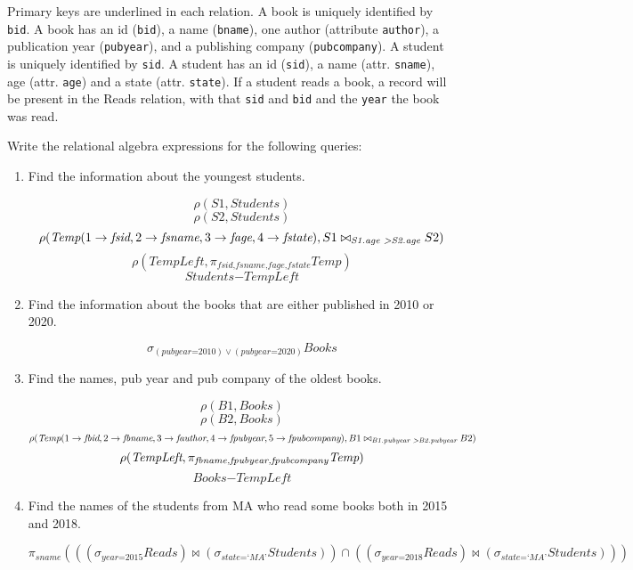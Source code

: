 \documentclass[letterpaper, 11pt]{article}
\begin{document}
Primary keys are underlined  in each relation. A book is uniquely identified by \texttt{bid}. A book has an id (\texttt{bid}), a name (\texttt{bname}), one author (attribute \texttt{author}), a publication year (\texttt{pubyear}), and a publishing company (\texttt{pubcompany}). A student is uniquely identified by \texttt{sid}. A student has an id (\texttt{sid}), a name (attr. \texttt{sname}), age (attr. \texttt{age}) and a state (attr. \texttt{state}). If a student reads a book, a record will be present in the Reads relation, with that \texttt{sid} and \texttt{bid} and the \texttt{year} the book was read.

Write the relational algebra expressions for the following queries:
\begin{enumerate}[label={\alph*}),leftmargin=*]
    \item Find the information about the youngest students.
    \begin{tcolorbox}
    \[\rho(S1, \textit{Students})\]
    \[\rho(S2, \textit{Students})\]
    \[\rho(\textit{Temp}(1 \to \textit{fsid}, 2 \to \textit{fsname}, 3 \to \textit{fage}, 4 \to \textit{fstate}), S1 \bowtie_{\textit{S1.age \textgreater S2.age}}S2)\]
    \[\rho(\textit{TempLeft}, \pi_{\textit{fsid,fsname,fage,fstate}}\textit{Temp})\]
    \[\textit{Students} - \textit{TempLeft}\]
    \end{tcolorbox}
    \item Find the information about the books that are either published in 2010 or 2020.
    \begin{tcolorbox}
    \[\sigma_{(\textit{pubyear=2010}) \vee (\textit{pubyear=2020})}\textit{Books}\]
    \end{tcolorbox}
    \item Find the names, pub year and pub company of the oldest books.
    \begin{tcolorbox}
    \[\rho(B1, \textit{Books})\]
    \[\rho(B2, \textit{Books})\]
    \[\rho(\textit{Temp}(1 \to \textit{fbid}, 2 \to \textit{fbname}, 3 \to \textit{fauthor}, 4 \to \textit{fpubyear}, 5 \to \textit{fpubcompany}), B1 \bowtie_{\textit{B1.pubyear \textgreater B2.pubyear}} B2)\]
    \[\rho(\textit{TempLeft}, \pi_{\textit{fbname,fpubye\textit{}ar,fpubcompany}}\textit{Temp})\]
    \[\textit{Books} - \textit{TempLeft}\]
    \end{tcolorbox}
    \item Find the names of the students from MA who read some books both in 2015 and 2018.
    \begin{tcolorbox}
    \[\pi_{\textit{sname}}(((\sigma_{\textit{year=2015}}\textit{Reads}) \bowtie (\sigma_{\textit{state=`MA'}}\textit{Students})) \cap ((\sigma_{\textit{year=2018}}\textit{Reads}) \bowtie (\sigma_{\textit{state=`MA'}}\textit{Students})))\]

\end{tcolorbox}
\end{enumerate}
\end{document}

